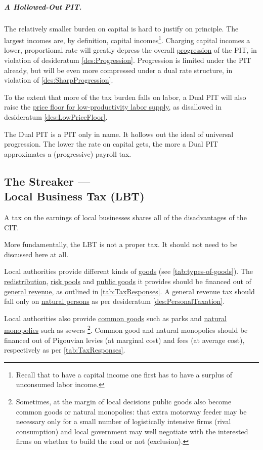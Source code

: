 \subparagraph{A Hollowed-Out PIT.} The relatively smaller burden on capital is hard to justify on principle. The largest incomes are, by definition, capital incomes\footnote{
	Recall that to have a capital income one first has to have a surplus of unconsumed labor income.}.
Charging capital incomes a lower, proportional rate will greatly depress the overall \hyperref[des:Progression]{progression} of the PIT, in violation of desideratum \ref{des:Progression}. Progression is limited under the PIT already, but will be even more compressed under a dual rate structure, in violation of \ref{des:SharpProgression}.

To the extent that more of the tax burden falls on labor, a Dual PIT will also raise the \hyperref[des:LowPriceFloor]{price floor for low-productivity labor supply}, as disallowed in desideratum \ref{des:LowPriceFloor}.

The Dual PIT is a PIT only in name. It hollows out the ideal of universal progression. %
The lower the rate on capital gets, the more a Dual PIT approximates a (progressive) payroll tax.

\subsection[Business Tax]{The Streaker ---\\Local Business Tax (LBT)} \label{sec:ScoreLBT} A tax on the earnings of local businesses shares all of the disadvantages of the CIT.

More fundamentally, the LBT is not a proper tax. It should not need to be discussed here at all.

Local authorities provide different kinds of \hyperref[tab:types-of-goods]{goods} (see \autoref{tab:types-of-goods}). The \hyperref[sec:Redistribution]{redistribution}, \hyperref[sec:RiskPooling]{risk pools} and \hyperref[sec:PublicGood]{public goods} it provides should be financed out of \hyperref[tab:TaxResponses]{general revenue}, as outlined in \autoref{tab:TaxResponses}. A general revenue tax should fall only on \hyperref[des:PersonalTaxation]{natural persons} as per desideratum \ref{des:PersonalTaxation}.

Local authorities also provide \hyperref[sec:CommonGood]{common goods} such as parks and \hyperref[sec:NaturalMonopolies]{natural monopolies} such as sewers \footnote{Sometimes, at the margin of local decisions public goods also become common goods or natural monopolies: that extra motorway feeder may be necessary only for a small number of logistically intensive firms (rival consumption) and local government may well negotiate with the interested firms on whether to build the road or not (exclusion).}. Common good and natural monopolies should be financed out of Pigouvian levies (at marginal cost) and fees (at average cost), respectively as per \autoref{tab:TaxResponses}.

